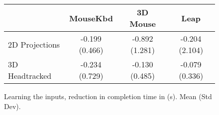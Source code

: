 \begin{figure}
    \centering

    \begin{tabular}{l | c c c}
      $ $             & MouseKbd       & 3D Mouse       & Leap          \\
      \hline
      2D Projections  & -0.199 (0.466)  & -0.892 (1.281)  & -0.204 (2.104) \\
      3D Headtracked  & -0.234 (0.729)  & -0.130 (0.485)  & -0.079 (0.336) \\
    \end{tabular}
   
    \caption{Learning the inputs, reduction in completion time in (s).  Mean (Std Dev).}
    \label{fig:improvementtimes}
\end{figure}
